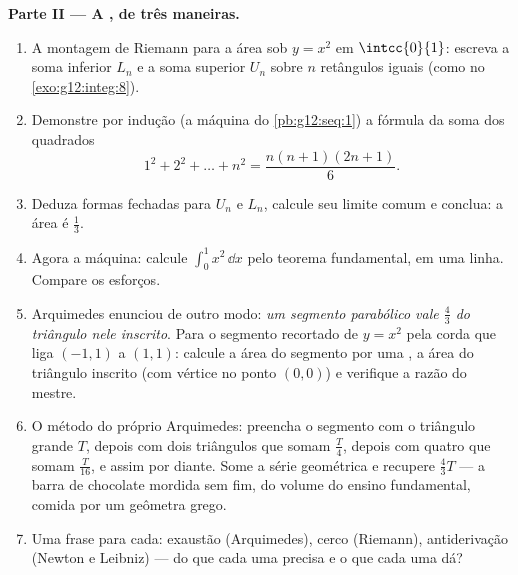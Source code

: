 \begin{problem}
\medskip
\noindent\textbf{Parte II --- A , de três maneiras.}
\begin{enumerate}[resume]
  \item A montagem de Riemann para a área sob $y = x^2$ em
        $\intcc{0}{1}$: escreva a soma inferior $L_n$ e a soma
        superior $U_n$ sobre $n$ retângulos iguais (como no
        \cref{exo:g12:integ:8}).
  \item Demonstre por indução (a máquina do
        \cref{pb:g12:seq:1}) a fórmula da soma dos quadrados
        \[
        1^2 + 2^2 + \dots + n^2 = \frac{n(n+1)(2n+1)}{6} .
        \]
  \item Deduza formas fechadas para $U_n$ e $L_n$, calcule seu
        limite comum e conclua: a área é $\frac13$.
  \item Agora a máquina: calcule $\int_0^1 x^2\,\dd x$ pelo
        teorema fundamental, em uma linha. Compare os esforços.
  \item Arquimedes enunciou de outro modo: \emph{um segmento
        parabólico vale $\frac43$ do triângulo nele inscrito}.
        Para o segmento recortado de $y = x^2$ pela corda que
        liga $(-1, 1)$ a $(1, 1)$: calcule a área do segmento por
        uma , a área do triângulo inscrito (com vértice
        no ponto $(0, 0)$) e verifique a razão do mestre.
  \item O método do próprio Arquimedes: preencha o segmento com o
        triângulo grande $T$, depois com dois triângulos que
        somam $\frac T4$, depois com quatro que somam
        $\frac{T}{16}$, e assim por diante. Some a série
        geométrica e recupere $\frac43 T$ --- a barra de
        chocolate mordida sem fim, do volume do ensino
        fundamental, comida por um geômetra grego.
  \item Uma frase para cada: exaustão (Arquimedes), cerco
        (Riemann), antiderivação (Newton e Leibniz) --- do que
        cada uma precisa e o que cada uma dá?
\end{enumerate}


\end{problem}

